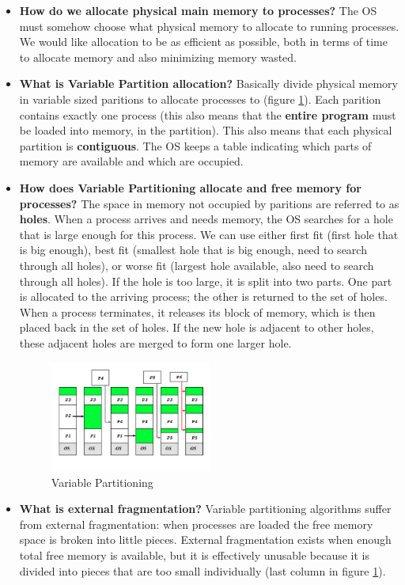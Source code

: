 \documentclass[12pt]{article}
\begin{document}
\begin{itemize}
    \item \textbf{How do we allocate physical main memory to processes?} The OS must somehow choose what physical memory to allocate to running processes. We would like allocation to be as efficient as possible, both in terms of time to allocate memory and also minimizing memory wasted.
    \item \textbf{What is Variable Partition allocation?} Basically divide physical memory in variable sized paritions to allocate processes to (figure \ref{fig:variable-partitioning}). Each parition contains exactly one process (this also means that the \textbf{entire program} must be loaded into memory, in the partition). This also means that each physical partition is \textbf{contiguous}. The OS keeps a table indicating which parts of memory are available and which are occupied.
    \item \textbf{How does Variable Partitioning allocate and free memory for processes?} The space in memory not occupied by paritions are referred to as \textbf{holes}. When a process arrives and needs memory, the OS searches for a hole that is large enough for this process. We can use either first fit (first hole that is big enough), best fit (smallest hole that is big enough, need to search through all holes), or worse fit (largest hole available, also need to search through all holes). If the hole is too large, it is split into two parts. One part is allocated to the arriving process; the other is returned to the set of holes. When a process terminates, it releases its block of memory, which is then placed back in the set of holes. If the new hole is adjacent to other holes, these adjacent holes are merged to form one larger hole.
        \begin{figure}[ht]
            \centering
            \includegraphics[width=0.5\textwidth]{figures/variable-partitioning.jpg}
            \caption{Variable Partitioning}
            \label{fig:variable-partitioning}
        \end{figure}
    \item \textbf{What is external fragmentation?} Variable partitioning algorithms suffer from external fragmentation: when processes are loaded the free memory space is broken into little pieces. External fragmentation exists when enough total free memory is available, but it is effectively unusable because it is divided into pieces that are too small individually (last column in figure \ref{fig:variable-partitioning}).

\end{itemize}
\end{document}
